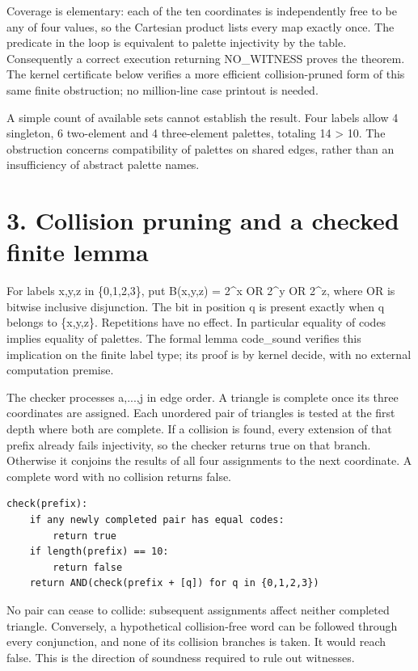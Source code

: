 \documentclass[10pt]{article}
\begin{document}
Coverage is elementary: each of the ten coordinates is independently free to be any of four values, so the Cartesian product lists every map exactly once. The predicate in the loop is equivalent to palette injectivity by the table. Consequently a correct execution returning NO\_WITNESS proves the theorem. The kernel certificate below verifies a more efficient collision-pruned form of this same finite obstruction; no million-line case printout is needed.


A simple count of available sets cannot establish the result. Four labels allow 4 singleton, 6 two-element and 4 three-element palettes, totaling 14 > 10. The obstruction concerns compatibility of palettes on shared edges, rather than an insufficiency of abstract palette names.


\clearpage
\section*{3. Collision pruning and a checked finite lemma}
For labels x,y,z in \{0,1,2,3\}, put B(x,y,z) = 2^x OR 2^y OR 2^z, where OR is bitwise inclusive disjunction. The bit in position q is present exactly when q belongs to \{x,y,z\}. Repetitions have no effect. In particular equality of codes implies equality of palettes. The formal lemma code\_sound verifies this implication on the finite label type; its proof is by kernel decide, with no external computation premise.


The checker processes a,...,j in edge order. A triangle is complete once its three coordinates are assigned. Each unordered pair of triangles is tested at the first depth where both are complete. If a collision is found, every extension of that prefix already fails injectivity, so the checker returns true on that branch. Otherwise it conjoins the results of all four assignments to the next coordinate. A complete word with no collision returns false.


\begin{verbatim}
check(prefix):
    if any newly completed pair has equal codes:
        return true
    if length(prefix) == 10:
        return false
    return AND(check(prefix + [q]) for q in {0,1,2,3})
\end{verbatim}
No pair can cease to collide: subsequent assignments affect neither completed triangle. Conversely, a hypothetical collision-free word can be followed through every conjunction, and none of its collision branches is taken. It would reach false. This is the direction of soundness required to rule out witnesses.
\end{document}
